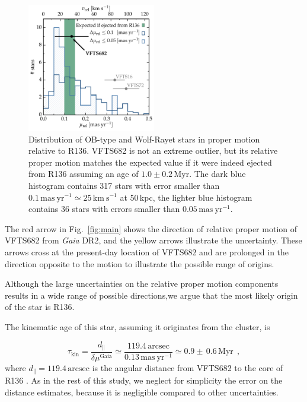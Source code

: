 \documentclass[apjl,twocolumn]{emulateapj}
\DeclareRobustCommand{\Eqref}[1]{Eq.~\ref{#1}}
\DeclareRobustCommand{\Figref}[1]{Fig.~\ref{#1}}
\begin{document}
\begin{figure}[htbp]
  \centering
  \includegraphics[width=0.5\textwidth]{figures/dist_mu_region.pdf}
  \caption{Distribution of OB-type and Wolf-Rayet stars in proper
    motion relative to R136. VFTS682 is not an extreme outlier, but
    its relative proper motion matches the expected value if it were indeed
    ejected from R136 assuming an age of $1.0\pm0.2$\,Myr. The dark blue histogram contains 317 
    stars with error smaller than $0.1\,\mathrm{mas \
      yr^{-1}}\simeq25\,\mathrm{km\ s^{-1}}$ at 50\,kpc, the
    lighter blue histogram contains 36 stars with errors smaller than $0.05\,\mathrm{mas \
      yr^{-1}}$.}
  \label{fig:mu_dist}
\end{figure}


The red arrow in \Figref{fig:main} shows the direction of relative proper motion of
VFTS682 from \emph{Gaia} DR2, and the
yellow arrows illustrate the uncertainty. %
These arrows cross at the present-day location of VFTS682 and
are prolonged in the direction opposite to the motion to illustrate
the possible range of origins. %

Although the large uncertainties on the relative proper motion
components results in a wide range of possible directions,we argue that the most likely origin of the star is R136.

The kinematic age of this star, assuming it originates from the
cluster, is

\begin{equation}
  \label{eq:kin_age}
  \tau_\mathrm{kin} = \frac{d_\parallel}{\delta\mu^\mathrm{Gaia}} \simeq
  \frac{119.4\,\mathrm{arcsec}}{0.13\,\mathrm{mas\ yr^{-1}}} \simeq 0.9\pm\,0.6\, \mathrm{Myr} \ \ ,
\end{equation}
where $d_\parallel = 119.4\,\mathrm{arcsec}$ is the angular distance from VFTS682 to
the core of R136 \citep[corresponding to $\sim$29\,pc at LMC distance,][]{bestenlehner:11}.
As in the rest of this study, we neglect for
simplicity the error on the distance estimates, because it is negligible compared to other uncertainties.
\end{document}
